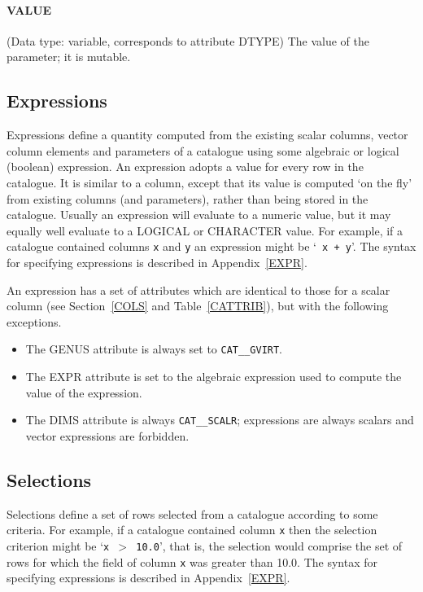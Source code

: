 \paragraph{VALUE}
(Data type: variable, corresponds to attribute DTYPE)
The value of the parameter; it is mutable.


\subsection{Expressions}

Expressions define a quantity computed from the existing scalar columns,
vector column elements and parameters of a catalogue using some 
algebraic or logical (boolean) expression. An expression adopts a value 
for every row in the catalogue. It is similar to a column, except that 
its value is computed `on the fly' from existing columns (and 
parameters), rather than being stored in the catalogue. Usually an 
expression will evaluate to a numeric value, but it may equally well 
evaluate to a LOGICAL or CHARACTER value. For example, if a catalogue 
contained columns {\tt x} and {\tt y} an expression might be `{\tt
x + y}'. The syntax for specifying expressions is described in
Appendix~\ref{EXPR}.

An expression has a set of attributes which are identical to those for
a scalar column (see Section~\ref{COLS} and Table~\ref{CATTRIB}), but
with the following exceptions.

\begin{itemize}

  \item The GENUS attribute is always set to {\tt CAT\_\_GVIRT}.

  \item The EXPR attribute is set to the algebraic expression used to
   compute the value of the expression.

  \item The DIMS attribute is always {\tt CAT\_\_SCALR}; expressions are
   always scalars and vector expressions are forbidden.

\end{itemize}


\subsection{Selections}

Selections define a set of rows selected from a catalogue according to
some criteria. For example, if a catalogue contained column {\tt x}
then the selection criterion might be `{\tt x $>$ 10.0}', that is, the 
selection would comprise the set of rows for which the field of column 
{\tt x} was greater than 10.0. The syntax for specifying expressions is 
described in Appendix~\ref{EXPR}.

